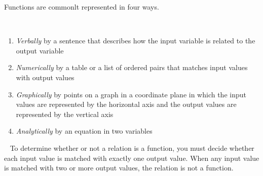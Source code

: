 \documentclass[11pt,fleqn,openany]{book} %
\begin{document}
Functions are commonlt represented in four ways.

\begin{proposition}~\newline
\begin{enumerate}
    \item \textit{Verbally} by a sentence that describes how the input variable is related to the output variable
    \item \textit{Numerically} by a table or a list of ordered pairs that matches input values with output values
    \item \textit{Graphically} by points on a graph in a coordinate plane in which the input values are represented by the horizontal axis and the output values are represented by the vertical axis
    \item \textit{Analytically} by an equation in two variables
    \end{enumerate}
    \end{proposition}
~\newline
To determine whether or not a relation is a function, you must decide whether each input value is matched with exactly one output value. When any input value is matched with two or more output values, the relation is not a function.
\end{document}

